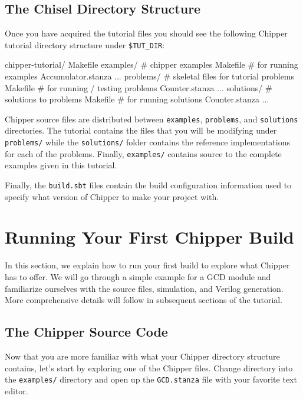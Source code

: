 \subsection{The Chisel Directory Structure}

Once you have acquired the tutorial files you should see the following Chipper tutorial directory structure under \verb+$TUT_DIR+:

\begin{bash}
chipper-tutorial/  
  Makefile
  examples/   # chipper examples
    Makefile  # for running examples
    Accumulator.stanza ...
  problems/   # skeletal files for tutorial problems
    Makefile  # for running / testing problems
    Counter.stanza ...
  solutions/  # solutions to problems
    Makefile  # for running solutions
    Counter.stanza ...
\end{bash}

Chipper source files are distributed between \verb+examples+, \verb+problems+, and \verb+solutions+ directories.
The tutorial contains the files that you will be modifying under \verb+problems/+ while the \verb+solutions/+ folder contains the reference implementations for each of the problems.  Finally, \verb+examples/+ contains source to the complete examples given in this tutorial.

Finally, the \verb+build.sbt+ files contain the build configuration information used to specify what version of Chipper to make your project with.

\section{Running Your First Chipper Build}

In this section, we explain how to run your first build to explore what Chipper has to offer. We will go through a simple example for a GCD module and familiarize ourselves with the source files, simulation, and Verilog generation. More comprehensive details will follow in subsequent sections of the tutorial.

\subsection{The Chipper Source Code}

Now that you are more familiar with what your Chipper directory structure contains, let's start by exploring one of the Chipper files. Change directory into the \verb+examples/+ directory and open up the \verb+GCD.stanza+ file with your favorite text editor. 

